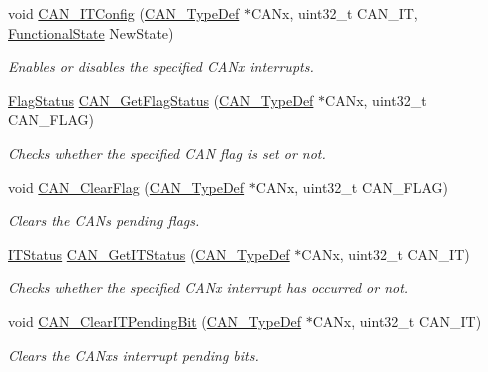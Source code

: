 \begin{DoxyCompactItemize}
void \mbox{\hyperlink{group___c_a_n___exported___functions_gad1a8b2499a780b5bfa4accb3597b02f4}{C\+A\+N\+\_\+\+I\+T\+Config}} (\mbox{\hyperlink{struct_c_a_n___type_def}{C\+A\+N\+\_\+\+Type\+Def}} $\ast$C\+A\+Nx, uint32\+\_\+t C\+A\+N\+\_\+\+IT, \mbox{\hyperlink{group___exported__types_gac9a7e9a35d2513ec15c3b537aaa4fba1}{Functional\+State}} New\+State)
\begin{DoxyCompactList}\small\item\em Enables or disables the specified C\+A\+Nx interrupts. \end{DoxyCompactList}\item 
\mbox{\hyperlink{group___exported__types_ga89136caac2e14c55151f527ac02daaff}{Flag\+Status}} \mbox{\hyperlink{group___c_a_n___exported___functions_ga2faad96caf823ef463cc5b5b25c480bb}{C\+A\+N\+\_\+\+Get\+Flag\+Status}} (\mbox{\hyperlink{struct_c_a_n___type_def}{C\+A\+N\+\_\+\+Type\+Def}} $\ast$C\+A\+Nx, uint32\+\_\+t C\+A\+N\+\_\+\+F\+L\+AG)
\begin{DoxyCompactList}\small\item\em Checks whether the specified C\+AN flag is set or not. \end{DoxyCompactList}\item 
void \mbox{\hyperlink{group___c_a_n___exported___functions_ga2c01646d5d3a2d7045e8dd71f58f8742}{C\+A\+N\+\_\+\+Clear\+Flag}} (\mbox{\hyperlink{struct_c_a_n___type_def}{C\+A\+N\+\_\+\+Type\+Def}} $\ast$C\+A\+Nx, uint32\+\_\+t C\+A\+N\+\_\+\+F\+L\+AG)
\begin{DoxyCompactList}\small\item\em Clears the C\+AN\textquotesingle{}s pending flags. \end{DoxyCompactList}\item 
\mbox{\hyperlink{group___exported__types_gaacbd7ed539db0aacd973a0f6eca34074}{I\+T\+Status}} \mbox{\hyperlink{group___c_a_n___exported___functions_ga9aca05b3013e1b3438f3559f80b33c82}{C\+A\+N\+\_\+\+Get\+I\+T\+Status}} (\mbox{\hyperlink{struct_c_a_n___type_def}{C\+A\+N\+\_\+\+Type\+Def}} $\ast$C\+A\+Nx, uint32\+\_\+t C\+A\+N\+\_\+\+IT)
\begin{DoxyCompactList}\small\item\em Checks whether the specified C\+A\+Nx interrupt has occurred or not. \end{DoxyCompactList}\item 
void \mbox{\hyperlink{group___c_a_n___exported___functions_ga30bf7ac0c1793f6622a4a1adbb7dbc8a}{C\+A\+N\+\_\+\+Clear\+I\+T\+Pending\+Bit}} (\mbox{\hyperlink{struct_c_a_n___type_def}{C\+A\+N\+\_\+\+Type\+Def}} $\ast$C\+A\+Nx, uint32\+\_\+t C\+A\+N\+\_\+\+IT)
\begin{DoxyCompactList}\small\item\em Clears the C\+A\+Nx\textquotesingle{}s interrupt pending bits. \end{DoxyCompactList}\end{DoxyCompactItemize}


